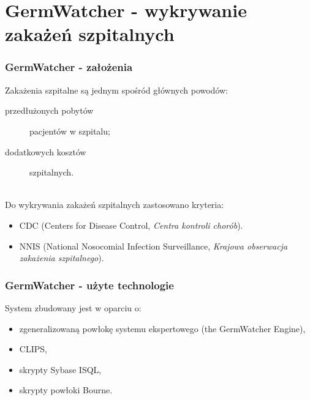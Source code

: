 \section{GermWatcher - wykrywanie zakażeń szpitalnych}


\begin{frame}
\frametitle{GermWatcher - założenia}

  Zakażenia szpitalne są jednym spośród głównych powodów:
  \begin{description} 
    \item[przedłużonych pobytów] pacjentów w szpitalu;
    \item[dodatkowych kosztów] szpitalnych.
  \end{description}
  \\
  Do wykrywania zakażeń szpitalnych zastosowano kryteria:
  \begin{itemize}
	  \item CDC (Centers for Disease Control, \textit{Centra kontroli chorób}).
	  \item NNIS (National Nosocomial Infection Surveillance, \textit{Krajowa obserwacja zakażenia szpitalnego}).
  \end{itemize} 

\end{frame}

\begin{frame}
\frametitle{GermWatcher - użyte technologie}

  System zbudowany jest w oparciu o:
  \begin{itemize}
	  \item zgeneralizowaną powłokę systemu ekspertowego (the GermWatcher Engine),
	  \item CLIPS,
	  \item skrypty Sybase ISQL,
	  \item skrypty powłoki Bourne.
  \end{itemize}

\end{frame}

